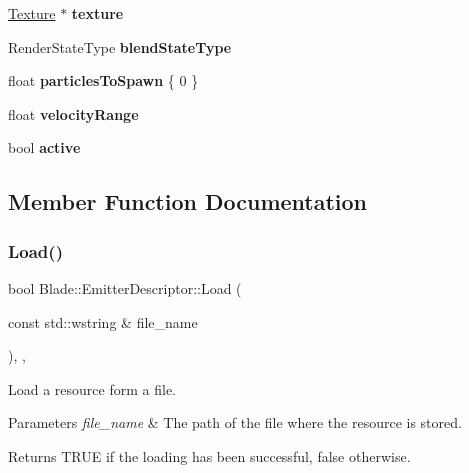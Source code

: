 \begin{DoxyCompactItemize}
\hyperlink{class_blade_1_1_texture}{Texture} $\ast$ {\bfseries texture}
\item 
\mbox{\label{struct_blade_1_1_emitter_descriptor_a157b590550eb8587ead1968030ae432a}} 
Render\+State\+Type {\bfseries blend\+State\+Type}
\item 
\mbox{\label{struct_blade_1_1_emitter_descriptor_a2f0d7f9a227f3f5e6d816b14ec18d7f2}} 
float {\bfseries particles\+To\+Spawn} \{ 0 \}
\item 
\mbox{\label{struct_blade_1_1_emitter_descriptor_a93476142c0c33f767d355b400ab0845c}} 
float {\bfseries velocity\+Range}
\item 
\mbox{\label{struct_blade_1_1_emitter_descriptor_a84142b39476686f7f68c1cf8bb8ef6b1}} 
bool {\bfseries active}
\end{DoxyCompactItemize}


\subsection{Member Function Documentation}
\mbox{\label{struct_blade_1_1_emitter_descriptor_ac3bf4ccedee573630235f498a0c47822}} 
\subsubsection{\texorpdfstring{Load()}{Load()}}
{\footnotesize\ttfamily bool Blade\+::\+Emitter\+Descriptor\+::\+Load (\begin{DoxyParamCaption}\item[{const std\+::wstring \&}]{file\+\_\+name }\end{DoxyParamCaption})\hspace{0.3cm}{\ttfamily [override]}, {\ttfamily [virtual]}, {\ttfamily [noexcept]}}



Load a resource form a file. 


\begin{DoxyParams}{Parameters}
{\em file\+\_\+name} & The path of the file where the resource is stored. \\
\hline
\end{DoxyParams}
\begin{DoxyReturn}{Returns}
T\+R\+UE if the loading has been successful, false otherwise. 
\end{DoxyReturn}


